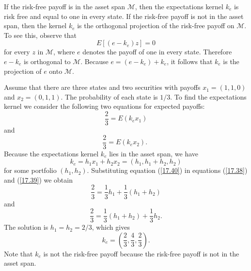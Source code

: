 \documentclass[\topdir/lecture\_notes.tex]{subfiles}
\begin{document}
If the risk-free payoff is in the asset span \(\mathcal{M}\), then the expectations kernel \(k_{e}\) is risk free and equal to one in every state. If the risk-free payoff is not in the asset span, then the kernel \(k_{e}\) is the orthogonal projection of the risk-free payoff on \(\mathcal{M}\). To see this, observe that
\begin{equation*}
E[(e-k_{e}) z]=0 
\end{equation*}
for every \(z\) in \(\mathcal{M}\), where \(e\) denotes the payoff of one in every state. Therefore \(e-k_{e}\) is orthogonal to \(\mathcal{M}\). Because \(e=\left(e-k_{e}\right)+k_{e}\), it follows that \(k_{e}\) is the projection of \(e\) onto \(\mathcal{M}\).
\begin{example}\label{ex:expectations_kernel_example}
Assume that there are three states and two securities with payoffs \(x_{1}=(1,1,0)\) and \(x_{2}=(0,1,1)\). The probability of each state is \(1 / 3\).
To find the expectations kernel we consider the following two equations for expected payoffs:
\begin{equation}
\frac{2}{3}=E\left(k_{e} x_{1}\right) \label{17.38}
\end{equation}
and
\begin{equation}
\frac{2}{3}=E\left(k_{e} x_{2}\right) \text {. } \label{17.39}
\end{equation}
Because the expectations kernel \(k_{e}\) lies in the asset span, we have
\begin{equation}
k_{e}=h_{1} x_{1}+h_{2} x_{2}=\left(h_{1}, h_{1}+h_{2}, h_{2}\right) \label{17.40}
\end{equation}
for some portfolio \(\left(h_{1}, h_{2}\right)\). Substituting equation (\ref{17.40}) in equations (\ref{17.38}) and (\ref{17.39}) we obtain
\begin{equation*}
\frac{2}{3}=\frac{1}{3} h_{1}+\frac{1}{3}\left(h_{1}+h_{2}\right) 
\end{equation*}
and
\begin{equation*}
\frac{2}{3}=\frac{1}{3}\left(h_{1}+h_{2}\right)+\frac{1}{3} h_{2} . 
\end{equation*}
The solution is \(h_{1}=h_{2}=2 / 3\), which gives
\begin{equation*}
k_{e}=\left(\frac{2}{3}, \frac{4}{3}, \frac{2}{3}\right). 
\end{equation*}
Note that \(k_{e}\) is not the risk-free payoff because the risk-free payoff is not in the asset span.
\end{example}
\end{document}
